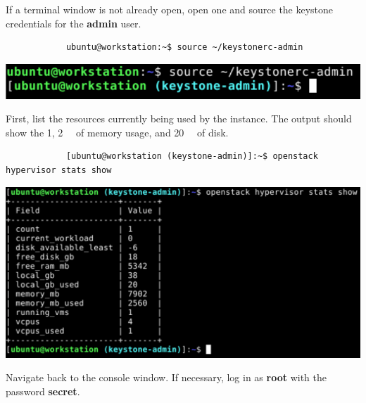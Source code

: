 \documentclass[letterpaper, 12pt]{article}
\begin{document}
\begin{enumerate}
    \begin{labstep}
        If a terminal window is not already open, open one and source the keystone credentials for the \textbf{admin} user.
        \begin{lstlisting}
            ubuntu@workstation:~$ source ~/keystonerc-admin
        \end{lstlisting}

        \begin{center}
            \includegraphics[width=\linewidth]{images/part6/step1.png}
        \end{center}
    \end{labstep}

    \begin{labstep}
        First, list the resources currently being used by the instance.
        The output should show the \qty{1}{\vcpus}, \qty{2}{\giga\byte} of memory usage, and \qty{20}{\giga\byte} of disk.
        \begin{lstlisting}
            [ubuntu@workstation (keystone-admin)]:~$ openstack hypervisor stats show
        \end{lstlisting}

        \begin{center}
            \includegraphics[width=\linewidth]{images/part6/step2.png}
        \end{center}
    \end{labstep}

    \begin{labstep}
        Navigate back to the console window.
        If necessary, log in as \textbf{root} with the password \textbf{secret}.
    \end{labstep}


\end{enumerate}
\end{document}
